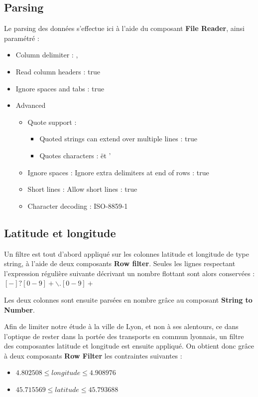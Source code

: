\subsection{Parsing}
Le parsing des données s'effectue ici à l'aide du composant \textbf{File Reader}, ainsi paramétré :
\begin{itemize}
    \item Column delimiter : ,
    \item Read column headers : true
    \item Ignore spaces and tabs : true
    \item Advanced
    \begin{itemize}
        \item Quote support :
        \begin{itemize}
            \item Quoted strings can extend over multiple lines : true
            \item Quotes characters : \" et '
        \end{itemize}
        \item Ignore spaces : Ignore extra delimiters at end of rows : true
        \item Short lines : Allow short lines : true
        \item Character decoding : ISO-8859-1
    \end{itemize}
\end{itemize}

\subsection{Latitude et longitude}
Un filtre est tout d'abord appliqué sur les colonnes latitude et longitude de type string, à l'aide de deux composants \textbf{Row filter}. Seules les lignes respectant l'expression régulière suivante décrivant un nombre flottant sont alors conservées : $[-]?[0-9]+\backslash.[0-9]+$

Les deux colonnes sont ensuite parsées en nombre grâce au composant \textbf{String to Number}.

Afin de limiter notre étude à la ville de Lyon, et non à ses alentours, ce dans l'optique de rester dans la portée des transports en commun lyonnais, un filtre des composantes latitude et longitude est ensuite appliqué.
On obtient donc grâce à deux composants \textbf{Row Filter} les contraintes suivantes :
\begin{itemize}
    \item $ 4.802508 \leq longitude \leq 4.908976 $
    \item $ 45.715569 \leq latitude \leq 45.793688 $
\end{itemize}

